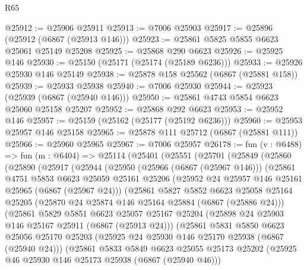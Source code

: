 \begin{lexlean}{R65}
\begin{coremodule}
{@25912 := @25906 @25911
@25913 := @7006 @25903
@25917 := @25896 (@25912 (@6867 (@25913 @146)))
@25923 := @25861 @5825 @5855 @6623 @25061 @25149 @25208
@25925 := @25868 @290 @6623
@25926 := @25925 @146
@25930 := @25150 (@25171 (@25174 (@25189 @6236)))
@25933 := @25926 @25930 @146 @25149
@25938 := @25878 @158 @25562 (@6867 (@25881 @158))
@25939 := @25933 @25938
@25940 := @7006 @25930
@25944 := @25923 (@25939 (@6867 (@25940 @146)))
@25950 := @25861 @4743 @5854 @6623 @25060 @25158 @25207
@25952 := @25868 @292 @6623
@25953 := @25952 @146
@25957 := @25159 (@25162 (@25177 (@25192 @6236)))
@25960 := @25953 @25957 @146 @25158
@25965 := @25878 @111 @25712 (@6867 (@25881 @111))
@25966 := @25960 @25965
@25967 := @7006 @25957
@26178 := fun (v : @6488) =>
  fun (m : @6404) =>
  @25114
    (@25401
      (@25551
        (@25701
          (@25849
            (@25860
              (@25890
                (@25917
                  (@25944
                    (@25950
                      (@25966 (@6867 (@25967 @146)))
                      (@25861
                        @4751
                        @5853
                        @6623
                        @25059
                        @25161
                        @25206
                        (@25952 @24 @25957 @146 @25161 @25965 (@6867 (@25967 @24)))
                        (@25861
                          @5827
                          @5852
                          @6623
                          @25058
                          @25164
                          @25205
                          (@25870 @24 @25874 @146 @25164 @25884 (@6867 (@25886 @24)))
                          (@25861
                            @5829
                            @5851
                            @6623
                            @25057
                            @25167
                            @25204
                            (@25898 @24 @25903 @146 @25167 @25911 (@6867 (@25913 @24)))
                            (@25861
                              @5831
                              @5850
                              @6623
                              @25056
                              @25170
                              @25203
                              (@25925 @24 @25930 @146 @25170 @25938 (@6867 (@25940 @24)))
                              (@25861
                                @5833
                                @5849
                                @6623
                                @25055
                                @25173
                                @25202
                                (@25925 @46 @25930 @146 @25173 @25938 (@6867 (@25940 @46)))
}
\end{coremodule}
\end{lexlean}

